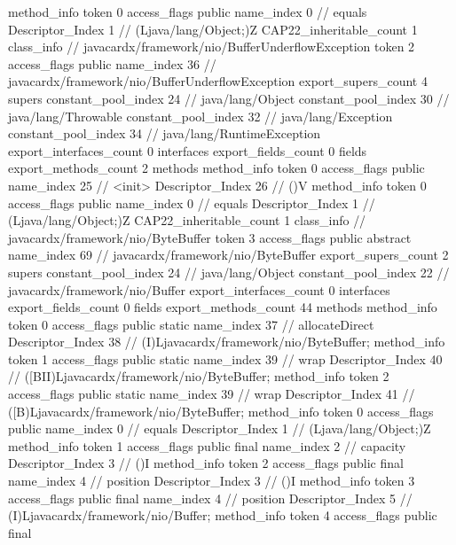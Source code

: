 {{{{{				}
				method_info {
					token	0
					access_flags	public
					name_index	0		// equals
					Descriptor_Index	1		// (Ljava/lang/Object;)Z
				}
			}
			CAP22_inheritable_count	1
		}
		class_info {		// javacardx/framework/nio/BufferUnderflowException
			token	2
			access_flags	public
			name_index	36		// javacardx/framework/nio/BufferUnderflowException
			export_supers_count	4
			supers {
				constant_pool_index	24		// java/lang/Object
				constant_pool_index	30		// java/lang/Throwable
				constant_pool_index	32		// java/lang/Exception
				constant_pool_index	34		// java/lang/RuntimeException
			}
			export_interfaces_count	0
			interfaces {
			}
			export_fields_count	0
			fields {
			}
			export_methods_count	2
			methods {
				method_info {
					token	0
					access_flags	public
					name_index	25		// <init>
					Descriptor_Index	26		// ()V
				}
				method_info {
					token	0
					access_flags	public
					name_index	0		// equals
					Descriptor_Index	1		// (Ljava/lang/Object;)Z
				}
			}
			CAP22_inheritable_count	1
		}
		class_info {		// javacardx/framework/nio/ByteBuffer
			token	3
			access_flags	public abstract
			name_index	69		// javacardx/framework/nio/ByteBuffer
			export_supers_count	2
			supers {
				constant_pool_index	24		// java/lang/Object
				constant_pool_index	22		// javacardx/framework/nio/Buffer
			}
			export_interfaces_count	0
			interfaces {
			}
			export_fields_count	0
			fields {
			}
			export_methods_count	44
			methods {
				method_info {
					token	0
					access_flags	public static
					name_index	37		// allocateDirect
					Descriptor_Index	38		// (I)Ljavacardx/framework/nio/ByteBuffer;
				}
				method_info {
					token	1
					access_flags	public static
					name_index	39		// wrap
					Descriptor_Index	40		// ([BII)Ljavacardx/framework/nio/ByteBuffer;
				}
				method_info {
					token	2
					access_flags	public static
					name_index	39		// wrap
					Descriptor_Index	41		// ([B)Ljavacardx/framework/nio/ByteBuffer;
				}
				method_info {
					token	0
					access_flags	public
					name_index	0		// equals
					Descriptor_Index	1		// (Ljava/lang/Object;)Z
				}
				method_info {
					token	1
					access_flags	public final
					name_index	2		// capacity
					Descriptor_Index	3		// ()I
				}
				method_info {
					token	2
					access_flags	public final
					name_index	4		// position
					Descriptor_Index	3		// ()I
				}
				method_info {
					token	3
					access_flags	public final
					name_index	4		// position
					Descriptor_Index	5		// (I)Ljavacardx/framework/nio/Buffer;
				}
				method_info {
					token	4
					access_flags	public final
}}}}}
